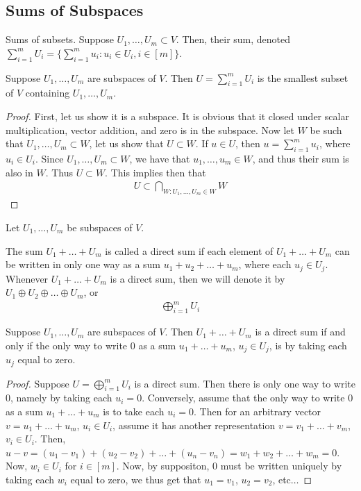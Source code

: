 \documentclass{article}
\begin{document}
\subsection{Sums of Subspaces}
  \begin{defn}
    Sums of subsets. Suppose $U_1, \dots, U_m \subset V$. Then, their sum, denoted $\sum_{i = 1}^{m}U_i = \{\sum_{i = 1}^{m}u_i: u_i \in U_i, i \in [m]\}$.
  \end{defn}
  \begin{prop}
    Suppose $U_1, \dots, U_m$ are subspaces of $V$. Then $U = \sum_{i = 1}^{m}U_i$ is the smallest subset of $V$ containing $U_1, \dots, U_m$.
  \end{prop}
  \begin{proof}
    First, let us show it is a subspace. It is obvious that it closed under scalar multiplication, vector addition, and zero is in the subspace. Now let $W$ be such that $U_1,
    \dots, U_m \subset W$, let us show that $U \subset W$. If $u \in U$, then $u = \sum_{i = 1}^{m}u_i$, where $u_i \in U_i$. Since $U_1, \dots, U_m \subset W$, we have that
    $u_1, \dots, u_m \in W$, and thus their sum is also in $W$. Thus $U \subset W$. This implies then that
    \begin{align*}
      U \subset \bigcap_{W: U_1, \dots, U_m \in W}W
    \end{align*}
  \end{proof}
  \begin{defn}
    Let $U_1, \dots, U_m$ be subspaces of $V$.
    \begin{enumerate}[label=\arabic*)]
      \ii The sum $U_1 + \dots + U_m$ is called a direct sum if each element of $U_1 + \dots + U_m$ can be written in only one way as a sum $u_1 + u_2 + \dots + u_m$, where
      each $u_j \in U_j$.
      \ii Whenever $U_1 + \dots + U_m$ is a direct sum, then we will denote it by $U_1 \oplus U_2 \oplus \dots \oplus U_m$, or 
      \begin{align*}
        \bigoplus_{i = 1}^{m}U_i
      \end{align*}
    \end{enumerate}
  \end{defn}
  \begin{prop}\label{prop:direct_sum_condition}
    Suppose $U_1, \dots, U_m$ are subspaces of $V$. Then $U_1 + \dots + U_m$ is a direct sum if and only if the only way to write $0$ as a sum $u_1 + \dots + u_m$, $u_j \in
    U_j$, is by taking each $u_j$ equal to zero.
  \end{prop}
  \begin{proof}
    Suppose $U = \bigoplus_{i = 1}^{m}U_i$ is a direct sum. Then there is only one way to write $0$, namely by taking each $u_i = 0$. Conversely, assume that the only way to
    write $0$ as a sum $u_1 + \dots + u_m$ is to take each $u_i = 0$. Then for an arbitrary vector $v = u_1 + \dots + u_m$, $u_i \in U_i$, assume it has another representation
    $v = v_1 + \dots + v_m$, $v_i \in U_i$. Then, $u - v = (u_1 - v_1) + (u_2 - v_2) + \dots + (u_n - v_n) = w_1 + w_2 + \dots + w_m = 0$. Now, $w_i \in U_i$ for $i \in [m]$.
    Now, by suppositon, $0$ must be written uniquely by taking each $w_i$ equal to zero, we thus get that $u_1 = v_1$, $u_2 = v_2$, etc$\ldots$ 
  \end{proof}
\end{document}
